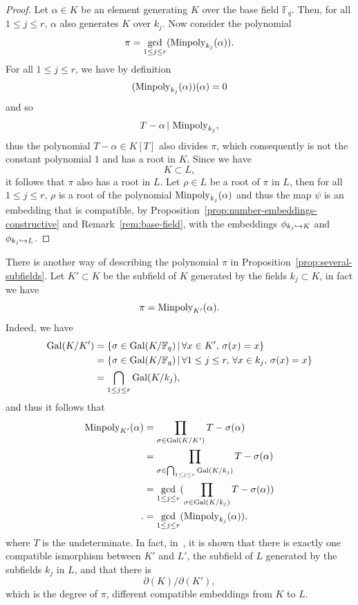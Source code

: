 \begin{proof}
  Let $\alpha\in K$ be an element generating $K$ over the base field
  $\mathbb{F}_q$. Then, for all $1\leq j\leq r$, $\alpha$ also generates $K$
  over $k_j$. Now consider the polynomial
  \[
    \pi = \gcd_{1\leq j\leq r}(\operatorname{Minpoly}_{k_j}(\alpha)).
  \]
  For all $1\leq j\leq r$, we have by definition
  \[
    (\operatorname{Minpoly}_{k_j}(\alpha))(\alpha) = 0
  \]
  and so
  \[
    T-\alpha\,|\,\operatorname{Minpoly}_{k_j},
  \]
  thus the polynomial $T-\alpha\in K[T]$ also divides $\pi$, which consequently is not the constant
  polynomial $1$ and has a root in $K$. Since we have
  \[
    K\subset L,
  \]
  it follows that $\pi$ also has a root in $L$. Let $\rho\in L$ be a root of $\pi$
  in $L$, then for all $1\leq j\leq r$, $\rho$ is a root of
  the polynomial $\operatorname{Minpoly}_{k_j}(\alpha)$ and thus the map $\psi$ is an
  embedding that is compatible, by
  Proposition~\ref{prop:number-embeddings-constructive} and
  Remark~\ref{rem:base-field}, with the embeddings
  $\phi_{k_j\hookrightarrow K}$ and $\phi_{k_j\hookrightarrow L}$.
\end{proof}
\begin{rem}
  \label{rem:greatest-common-subfield}
  There is another way of describing the polynomial $\pi$ in
  Proposition~\ref{prop:several-subfields}. Let $K'\subset K$ be the
  subfield of $K$ generated by the fields $k_j\subset K$, in fact we have
  \[
    \pi = \operatorname{Minpoly}_{K'}(\alpha).
  \]
  Indeed, we have
  \begin{align*}
    \operatorname{Gal}(K/K') &= \left\{ \sigma\in\operatorname{Gal}(K/\mathbb{F}_q)\,|\,\forall x\in
  K',\,\sigma(x) = x \right\}\\
  &= \left\{ \sigma\in\operatorname{Gal}(K/\mathbb{F}_q)\,|\,\forall 1\leq j\leq r,\,\forall x\in
  k_j,\,\sigma(x) = x \right\}\\
  &= \bigcap_{1\leq j\leq r}\operatorname{Gal}(K/k_j),
  \end{align*}
  and thus it follows that
  \begin{align*}
    \operatorname{Minpoly}_{K'}(\alpha) &= \prod_{\sigma\in\operatorname{Gal}(K/K')}T-\sigma(\alpha)\\
    &=\prod_{\sigma\in\bigcap_{1\leq j\leq r}\operatorname{Gal}(K/k_j)}T-\sigma(\alpha)\\
    &= \gcd_{1\leq j\leq r}(\prod_{\sigma\in\operatorname{Gal}(K/k_j)}T-\sigma(\alpha))\\.
    &= \gcd_{1\leq j\leq r}(\operatorname{Minpoly}_{k_j}(\alpha)).
  \end{align*}
  where $T$ is the undeterminate. In fact, in~\cite{BCS97}, it is shown that
  there is exactly one compatible ismorphism between $K'$ and $L'$, the subfield
  of $L$ generated by the subfields $k_j$ in $L$, and that there is
  \[
    \partial(K)/\partial(K'),
  \]
  which is the degree of $\pi$, different compatible embeddings from $K$ to $L$.
\end{rem}

